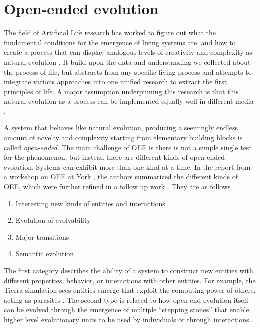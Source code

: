 \section{Open-ended evolution\label{sec:open-ended-evolution-1}}
The field of Artificial Life research has worked to figure out what the
fundamental conditions for the emergence of living systems are, and how to
create a process that can display analogous levels of creativity and complexity
as natural evolution \parencite{eigenHypercycle1979,
  langtonArtificialLifeProceedings1989, dysonOriginsLife1999,
  stanleyWhyOpenEndednessMatters2019, packardOverviewOpenEndedEvolution2019,
  sorosOpenendednessLastGrand2017}. It build upon the data and understanding we
collected about the process of life, but abstracts from any specific living
process and attempts to integrate various approaches into one unified research
to extract the first principles of life. A major assumption underpinning this
research is that this natural evolution as a process can be implemented equally
well in different media \parencite{dennettDarwinDangerousIdea1996}.

A system that behaves like natural evolution, producing a seemingly endless
amount of novelty and complexity starting from elementary building blocks is
called \emph{open-ended}. The main challenge of \ac{OEE} is there is not a simple
single test for the phenomenon, but instead there are different kinds of
open-ended evolution. Systems can exhibit more than one kind at a time. In the
report from a workshop on \ac{OEE} at York
\parencite{taylorOpenEndedEvolutionPerspectives2016}, the authors summarized the
different kinds of \ac{OEE}, which were further refined in a follow up work
\parencite{packardOverviewOpenEndedEvolution2019}. They are as follows

\begin{enumerate}
  \item Interesting new kinds of entities and interactions
  \item Evolution of evolvability
  \item Major transitions
  \item Semantic evolution
\end{enumerate}

The first category describes the ability of a system to construct new entities
with different properties, behavior, or interactions with other entities. For
example, the Tierra simulation sees entities emerge that exploit the computing
power of others, acting as parasites \parencite{srayApproachSynthesisLife1991}.
The second type is related to how open-end evolution itself can be evolved
through the emergence of multiple ``stepping stones'' that enable higher level
evolutionary units to be used by individuals or through interactions
\parencite{patteeEvolvedOpenEndednessNot2019}.

